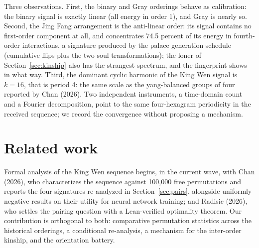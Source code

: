 \documentclass[11pt]{article}
\begin{document}
Three observations. First, the binary and Gray orderings behave as calibration: the binary signal is exactly linear (all energy in order 1), and Gray is nearly so. Second, the Jing Fang arrangement is the anti-linear order: its signal contains no first-order component at all, and concentrates 74.5 percent of its energy in fourth-order interactions, a signature produced by the palace generation schedule (cumulative flips plus the two soul transformations); the loner of Section~\ref{sec:kinship} also has the strangest spectrum, and the fingerprint shows in what way. Third, the dominant cyclic harmonic of the King Wen signal is $k = 16$, that is period 4: the same scale as the yang-balanced groups of four reported by Chan (2026). Two independent instruments, a time-domain count and a Fourier decomposition, point to the same four-hexagram periodicity in the received sequence; we record the convergence without proposing a mechanism.

\section{Related work}

Formal analysis of the King Wen sequence begins, in the current wave, with Chan (2026), who characterizes the sequence against 100,000 free permutations and reports the four signatures re-analyzed in Section~\ref{sec:pairs}, alongside uniformly negative results on their utility for neural network training; and Radisic (2026), who settles the pairing question with a Lean-verified optimality theorem. Our contribution is orthogonal to both: comparative permutation statistics across the historical orderings, a conditional re-analysis, a mechanism for the inter-order kinship, and the orientation battery.
\end{document}
